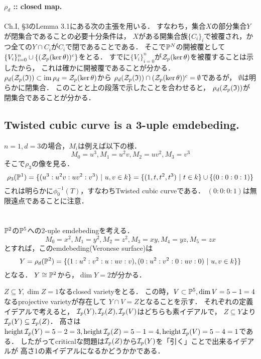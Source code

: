 \documentclass[a4paper]{jsarticle}
\begin{document}
    \paragraph{$\rho_d$ :: closed map.}
    Ch.I, \S 3のLemma 3.1にある次の主張を用いる．
    すなわち，集合$X$の部分集合$Y$が閉集合であることの必要十分条件は，
    $X$がある開集合族$\{C_i\}_i$で被覆され，かつ全ての$Y \cap C_i$が$C_i$で閉であることである．
    そこで$\mathbb{P}^N$の開被覆として$\{V_i\}_{i=0}^n \cup \{(\mathcal{Z}_p(\ker \theta))^c\}$をとる．
    すでに$\{V_i\}_{i=0}^n$が$\mathcal{Z}_p(\ker \theta)$を被覆することは示したから，
    これは確かに開被覆であることが分かる．
    $\rho_d(\mathcal{Z}_p(\mathfrak{I})) \subset \operatorname{im} \rho_d=\mathcal{Z}_p(\ker \theta)$から
    $\rho_d(\mathcal{Z}_p(\mathfrak{I})) \cap (\mathcal{Z}_p(\ker \theta))^c=\emptyset$であるが，
    $\emptyset$は明らかに閉集合．
    このことと上の段落で示したことを合わせると，
    $\rho_d(\mathcal{Z}_p(\mathfrak{I}))$が閉集合であることが分かる．

    \subsection{Twisted cubic curve is a 3-uple emdebeding.}
    $n=1, d=3$の場合，$M_i$は例えば以下の様．
    \[ M_0=u^3, M_1=u^2 v, M_2=u v^2, M_3=v^3 \]
    そこで$\rho_3$の像を見る．
    \[ \rho_3(\mathbb{P}^1)=\{ (u^3: u^2v: u v^2: v^3) ~|~ u,v \in k \}=\{ (1,t, t^2, t^3) ~|~ t \in k \} \cup \{(0:0:0:1)\}\]
    これは明らかに$\phi_0^{-1}(T)$，すなわちTwisted cubic curveである．
    $(0:0:0:1)$は無限遠点であることに注意．

\section{ } %
    $\mathbb{P}^2$の$\mathbb{P}^5$への2-uple emdebedingを考える．
    \[ M_0=x^2, M_1=y^2, M_2=z^2, M_3=xy, M_4=yz, M_5=zx \]
    とすれば，このemdebeding(Veronese surface)は
    \[ Y=\rho_d(\mathbb{P}^2)=\{ (1: u^2: v^2: u: uv: v), (0:u^2:v^2:0:uv:0) ~|~ u,v \in k \} \} \]
    となる．
    $Y \cong \mathbb{P}^2$から，$\dim  Y=2$が分かる．

    $Z \subseteq Y, \dim Z=1$なるclosed varietyをとる．
    この時，$V \subset \mathbb{P}^5, \dim V=5-1=4$なるprojective varietyが存在して
    $Y \cap V=Z$となることを示す．
    それぞれの定義イデアルで考えると，
    $\mathcal{I}_p(Y), \mathcal{I}_p(Z), \mathcal{I}_p(V)$はどちらも素イデアルで，
    $Z \subseteq Y$より$\mathcal{I}_p(Y) \subseteq \mathcal{I}_p(Z)$．
    高さは$\operatorname{height} \mathcal{I}_p(Y)=5-2=3, \operatorname{height} \mathcal{I}_p(Z)=5-1=4, \operatorname{height} \mathcal{I}_p(V)=5-4=1$である．
    したがってcriticalな問題は$\mathcal{I}_p(Z)$から$\mathcal{I}_p(Y)$を「引く」ことで出来るイデアルが
    高さ1の素イデアルになるかどうかかである．
\end{document}
